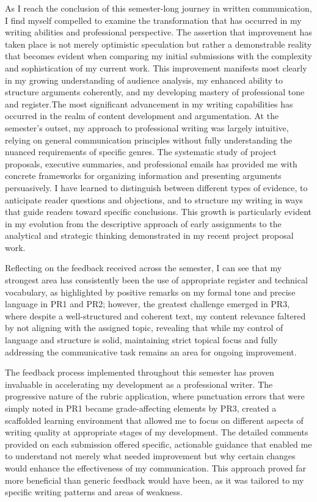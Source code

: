 \documentclass[
]{report}
\begin{document}
As I reach the conclusion of this semester-long journey in written
communication, I find myself compelled to examine the transformation
that has occurred in my writing abilities and professional perspective.
The assertion that improvement has taken place is not merely optimistic
speculation but rather a demonstrable reality that becomes evident when
comparing my initial submissions with the complexity and sophistication
of my current work. This improvement manifests most clearly in my
growing understanding of audience analysis, my enhanced ability to
structure arguments coherently, and my developing mastery of
professional tone and register.The most significant advancement in my
writing capabilities has occurred in the realm of content development
and argumentation. At the semester's outset, my approach to professional
writing was largely intuitive, relying on general communication
principles without fully understanding the nuanced requirements of
specific genres. The systematic study of project proposals, executive
summaries, and professional emails has provided me with concrete
frameworks for organizing information and presenting arguments
persuasively. I have learned to distinguish between different types of
evidence, to anticipate reader questions and objections, and to
structure my writing in ways that guide readers toward specific
conclusions. This growth is particularly evident in my evolution from
the descriptive approach of early assignments to the analytical and
strategic thinking demonstrated in my recent project proposal work.

Reflecting on the feedback received across the semester, I can see that
my strongest area has consistently been the use of appropriate register
and technical vocabulary, as highlighted by positive remarks on my
formal tone and precise language in PR1 and PR2; however, the greatest
challenge emerged in PR3, where despite a well-structured and coherent
text, my content relevance faltered by not aligning with the assigned
topic, revealing that while my control of language and structure is
solid, maintaining strict topical focus and fully addressing the
communicative task remains an area for ongoing improvement.

The feedback process implemented throughout this semester has proven
invaluable in accelerating my development as a professional writer. The
progressive nature of the rubric application, where punctuation errors
that were simply noted in PR1 became grade-affecting elements by PR3,
created a scaffolded learning environment that allowed me to focus on
different aspects of writing quality at appropriate stages of my
development. The detailed comments provided on each submission offered
specific, actionable guidance that enabled me to understand not merely
what needed improvement but why certain changes would enhance the
effectiveness of my communication. This approach proved far more
beneficial than generic feedback would have been, as it was tailored to
my specific writing patterns and areas of weakness.
\end{document}
